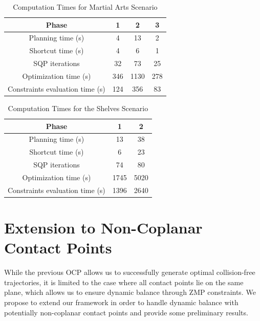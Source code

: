 \begin{table}
  \renewcommand{\arraystretch}{1.3}
  \caption{Computation Times for Martial Arts Scenario}
  \label{table-martial-art}
  \centering
  \begin{tabular}{|c||c|c|c|}
    \hline
    Phase & 1 & 2 & 3 \\
    \hline
    Planning time (s) & 4 & 13 & 2 \\
    \hline
    Shortcut time (s) & 4 & 6 & 1 \\
    \hline
    SQP iterations & 32 & 73 & 25 \\
    \hline
    Optimization time (s) & 346 & 1130 & 278 \\
    \hline
    Constraints evaluation time (s) & 124 & 356 & 83 \\
    \hline
  \end{tabular}
\end{table}

\begin{table}
  \renewcommand{\arraystretch}{1.3}
  \caption{Computation Times for the Shelves Scenario}
  \label{table-shelves}
  \centering
  \begin{tabular}{|c||c|c|}
    \hline
    Phase & 1 & 2 \\
    \hline
    Planning time (s) & 13 & 38 \\
    \hline
    Shortcut time (s) & 6 & 23 \\
    \hline
    SQP iterations & 74 & 80 \\
    \hline
    Optimization time (s) & 1745 & 5020 \\
    \hline
    Constraints evaluation time (s) & 1396 & 2640 \\
    \hline
  \end{tabular}
\end{table}

\section{Extension to Non-Coplanar Contact Points}
\label{sec:chap3-noncoplanar-contact-points}

While the previous OCP allows us to successfully generate optimal
collision-free trajectories, it is limited to the case where all
contact points lie on the same plane, which allows us to ensure
dynamic balance through ZMP constraints. We propose to extend our
framework in order to handle dynamic balance with potentially
non-coplanar contact points and provide some preliminary results.

